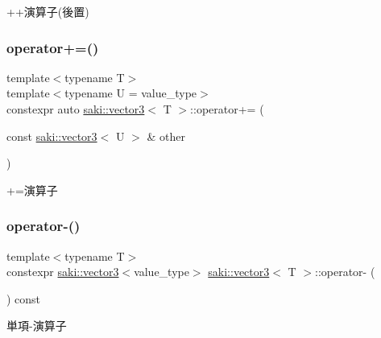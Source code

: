 ++演算子(後置) 

\mbox{\label{classsaki_1_1vector3_a43154ea2ea8a46b43e1bd7d6afe9dd09}} 
\subsubsection{\texorpdfstring{operator+=()}{operator+=()}}
{\footnotesize\ttfamily template$<$typename T$>$ \\
template$<$typename U  = value\+\_\+type$>$ \\
constexpr auto \mbox{\hyperlink{classsaki_1_1vector3}{saki\+::vector3}}$<$ T $>$\+::operator+= (\begin{DoxyParamCaption}\item[{const \mbox{\hyperlink{classsaki_1_1vector3}{saki\+::vector3}}$<$ U $>$ \&}]{other }\end{DoxyParamCaption})\hspace{0.3cm}{\ttfamily [inline]}}



+=演算子 

\mbox{\label{classsaki_1_1vector3_a6b8e1173064629de9e97c63f718d0a74}} 
\subsubsection{\texorpdfstring{operator-\/()}{operator-()}}
{\footnotesize\ttfamily template$<$typename T$>$ \\
constexpr \mbox{\hyperlink{classsaki_1_1vector3}{saki\+::vector3}}$<$value\+\_\+type$>$ \mbox{\hyperlink{classsaki_1_1vector3}{saki\+::vector3}}$<$ T $>$\+::operator-\/ (\begin{DoxyParamCaption}{ }\end{DoxyParamCaption}) const\hspace{0.3cm}{\ttfamily [inline]}}



単項-\/演算子 

\mbox{\label{classsaki_1_1vector3_ae72c214f2b976854cc8f87009eb34956}} 

